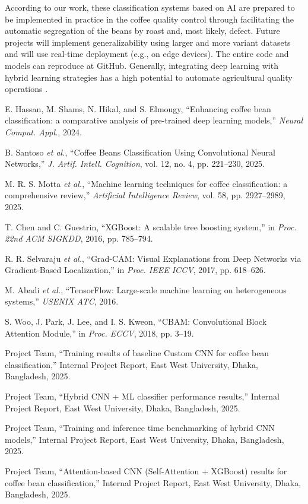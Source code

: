 \documentclass[conference]{IEEEtran}
\begin{document}
According to our work, these classification systems based on AI are prepared to be implemented in practice in the coffee quality control through facilitating the automatic segregation of the beans by roast and, most likely, defect. Future projects will implement generalizability using larger and more variant datasets and will use real-time deployment (e.g., on edge devices). The entire code and models can reproduce at GitHub. Generally, integrating deep learning with hybrid learning strategies has a high potential to automate agricultural quality operations \cite{Hassan2024,Motta2025}.




\begin{thebibliography}{00}
 E. Hassan, M. Shams, N. Hikal, and S. Elmougy, ``Enhancing coffee bean classification: a comparative analysis of pre-trained deep learning models,'' \textit{Neural Comput. Appl.}, 2024.

 B. Santoso \textit{et al.}, ``Coffee Beans Classification Using Convolutional Neural Networks,'' \textit{J. Artif. Intell. Cognition}, vol. 12, no. 4, pp. 221--230, 2025.

 M. R. S. Motta \textit{et al.}, ``Machine learning techniques for coffee classification: a comprehensive review,'' \textit{Artificial Intelligence Review}, vol. 58, pp. 2927--2989, 2025.

 T. Chen and C. Guestrin, ``XGBoost: A scalable tree boosting system,'' in \textit{Proc. 22nd ACM SIGKDD}, 2016, pp. 785--794.

 R. R. Selvaraju \textit{et al.}, ``Grad-CAM: Visual Explanations from Deep Networks via Gradient-Based Localization,'' in \textit{Proc. IEEE ICCV}, 2017, pp. 618--626.

 M. Abadi \textit{et al.}, ``TensorFlow: Large-scale machine learning on heterogeneous systems,'' \textit{USENIX ATC}, 2016.

 S. Woo, J. Park, J. Lee, and I. S. Kweon, ``CBAM: Convolutional Block Attention Module,'' in \textit{Proc. ECCV}, 2018, pp. 3--19.

 Project Team, ``Training results of baseline Custom CNN for coffee bean classification,'' Internal Project Report, East West University, Dhaka, Bangladesh, 2025.

 Project Team, ``Hybrid CNN + ML classifier performance results,'' Internal Project Report, East West University, Dhaka, Bangladesh, 2025.

 Project Team, ``Training and inference time benchmarking of hybrid CNN models,'' Internal Project Report, East West University, Dhaka, Bangladesh, 2025.

 Project Team, ``Attention-based CNN (Self-Attention + XGBoost) results for coffee bean classification,'' Internal Project Report, East West University, Dhaka, Bangladesh, 2025.


\end{thebibliography}
\end{document}
